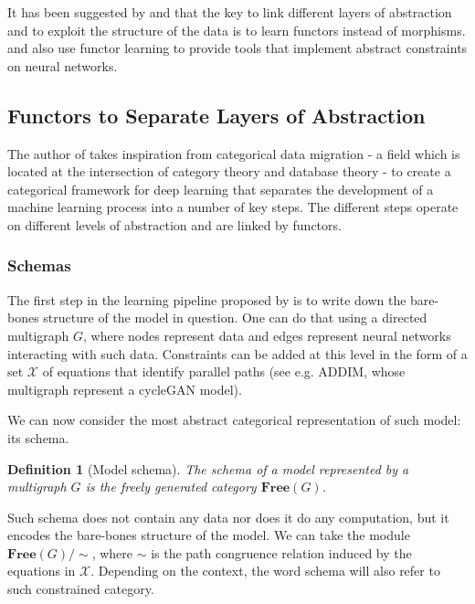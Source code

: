 \documentclass[11pt,a4paper,openright,twoside]{report}
\theoremstyle{plain}
\newtheorem{definition}[proposition]{Definition}
\theoremstyle{definition}
\begin{document}
It has been suggested by \cite{gavranovicLearningFunctorsUsing2020} and \cite{sheshmaniCategoricalRepresentationLearning2022} that the key to link different layers of abstraction and to exploit the structure of the data is to learn functors instead of morphisms. \cite{gavranovicLearningFunctorsUsing2020} and \cite{vaswaniAttentionAllYou2023} also use functor learning to provide tools that implement abstract constraints on neural networks.



\subsection{Functors to Separate Layers of Abstraction}

The author of \cite{gavranovicLearningFunctorsUsing2020} takes inspiration from categorical data migration - a field which is located at the intersection of category theory and database theory - to create a categorical framework for deep learning that separates the development of a machine learning process into a number of key steps. The different steps operate on different levels of abstraction and are linked by functors.

\subsubsection{Schemas}

The first step in the learning pipeline proposed by \cite{gavranovicLearningFunctorsUsing2020} is to write down the bare-bones structure of the model in question. One can do that using a directed multigraph $G$, where nodes represent data and edges represent neural networks interacting with such data. Constraints can be added at this level in the form of a set $\mathcal{X}$ of equations that identify parallel paths (see e.g. ADDIM, whose multigraph represent a cycleGAN model).


We can now consider the most abstract categorical representation of such model: its schema. 

\begin{definition}[Model schema]
  The schema of a model represented by a multigraph $G$ is the freely generated category $\mathbf{Free}(G)$.
\end{definition}

Such schema does not contain any data nor does it do any computation, but it encodes the bare-bones structure of the model. We can take the module $\mathbf{Free}(G)/{\sim}$, where ${\sim}$ is the path congruence relation induced by the equations in $\mathcal{X}$. Depending on the context, the word schema will also refer to such constrained category.
\end{document}
